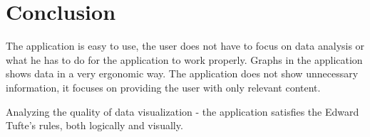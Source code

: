 \documentclass[a4paper,12pt,oneside]{article}
\begin{document}
\section{Conclusion}

The application is easy to use, the user does not have to focus on data analysis or what he has to do for the application to work properly. Graphs in the application shows data in a very ergonomic way. 
The application does not show unnecessary information, it focuses on providing the user with only relevant content.
\par Analyzing the quality of data visualization - the application satisfies the Edward Tufte's rules, both logically and visually.
\end{document}
